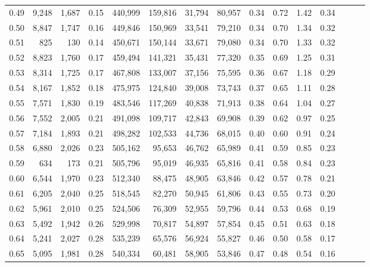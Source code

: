 \begin{tabular}{rrrrrrrrrrrrrrr}
0.49 &   9,248 &  1,687 &  0.15 &  440,999 &  159,816 &   31,794 &   80,957 &  0.34 &  0.72 &  1.42 &      0.34 \\
0.50 &   8,847 &  1,747 &  0.16 &  449,846 &  150,969 &   33,541 &   79,210 &  0.34 &  0.70 &  1.34 &      0.32 \\
0.51 &     825 &    130 &  0.14 &  450,671 &  150,144 &   33,671 &   79,080 &  0.34 &  0.70 &  1.33 &      0.32 \\
0.52 &   8,823 &  1,760 &  0.17 &  459,494 &  141,321 &   35,431 &   77,320 &  0.35 &  0.69 &  1.25 &      0.31 \\
0.53 &   8,314 &  1,725 &  0.17 &  467,808 &  133,007 &   37,156 &   75,595 &  0.36 &  0.67 &  1.18 &      0.29 \\
0.54 &   8,167 &  1,852 &  0.18 &  475,975 &  124,840 &   39,008 &   73,743 &  0.37 &  0.65 &  1.11 &      0.28 \\
0.55 &   7,571 &  1,830 &  0.19 &  483,546 &  117,269 &   40,838 &   71,913 &  0.38 &  0.64 &  1.04 &      0.27 \\
0.56 &   7,552 &  2,005 &  0.21 &  491,098 &  109,717 &   42,843 &   69,908 &  0.39 &  0.62 &  0.97 &      0.25 \\
0.57 &   7,184 &  1,893 &  0.21 &  498,282 &  102,533 &   44,736 &   68,015 &  0.40 &  0.60 &  0.91 &      0.24 \\
0.58 &   6,880 &  2,026 &  0.23 &  505,162 &   95,653 &   46,762 &   65,989 &  0.41 &  0.59 &  0.85 &      0.23 \\
0.59 &     634 &    173 &  0.21 &  505,796 &   95,019 &   46,935 &   65,816 &  0.41 &  0.58 &  0.84 &      0.23 \\
0.60 &   6,544 &  1,970 &  0.23 &  512,340 &   88,475 &   48,905 &   63,846 &  0.42 &  0.57 &  0.78 &      0.21 \\
0.61 &   6,205 &  2,040 &  0.25 &  518,545 &   82,270 &   50,945 &   61,806 &  0.43 &  0.55 &  0.73 &      0.20 \\
0.62 &   5,961 &  2,010 &  0.25 &  524,506 &   76,309 &   52,955 &   59,796 &  0.44 &  0.53 &  0.68 &      0.19 \\
0.63 &   5,492 &  1,942 &  0.26 &  529,998 &   70,817 &   54,897 &   57,854 &  0.45 &  0.51 &  0.63 &      0.18 \\
0.64 &   5,241 &  2,027 &  0.28 &  535,239 &   65,576 &   56,924 &   55,827 &  0.46 &  0.50 &  0.58 &      0.17 \\
0.65 &   5,095 &  1,981 &  0.28 &  540,334 &   60,481 &   58,905 &   53,846 &  0.47 &  0.48 &  0.54 &      0.16 \\

\end{tabular}
